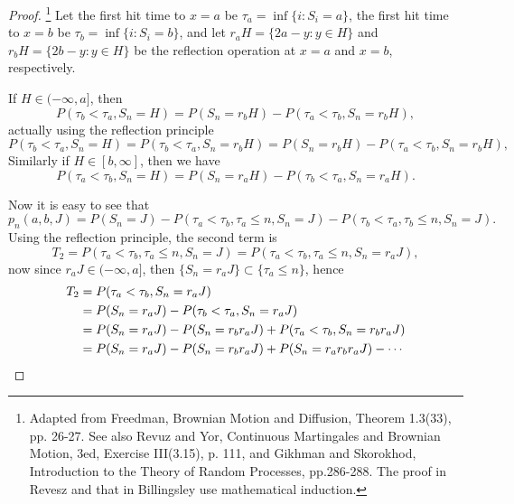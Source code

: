 \begin{proof}
\footnote{Adapted from Freedman, Brownian Motion and Diffusion, 
  Theorem 1.3(33), pp. 26-27.
  See also Revuz and Yor, Continuous Martingales and Brownian Motion, 3ed,
  Exercise III(3.15), p. 111,
  and Gikhman and Skorokhod, Introduction to the Theory of Random Processes,
  pp.286-288. The proof in Revesz and that in Billingsley use mathematical
  induction.} 
Let the first hit time to $x=a$ be $\tau_a=\inf \{i:S_i=a\}$,
the first hit time to $x=b$ be $\tau_b=\inf \{i:S_i=b\}$, 
and let $r_a H=\{2a-y: y\in H\}$ and $r_b H=\{2b-y: y\in H\}$ be the reflection
operation at $x=a$ and $x=b$, respectively.

If $H\in (-\infty,a]$, then
\[
  P(\tau_b <\tau_a, S_n=H) = P(S_n=r_b H) - P(\tau_a<\tau_b, S_n=r_b H),
\]
actually using the reflection principle
\[
  P(\tau_b <\tau_a, S_n=H) 
    = P(\tau_b <\tau_a, S_n=r_b H) 
    = P(S_n=r_b H) - P(\tau_a<\tau_b, S_n=r_b H),
\]
Similarly if $H\in [b,\infty]$, then we have
\[
  P(\tau_a <\tau_b, S_n=H) = P(S_n=r_a H) - P(\tau_b<\tau_a, S_n=r_a H).
\]

Now it is easy to see that
\[
  p_n(a,b,J) = P(S_n=J) - P(\tau_a<\tau_b, \tau_a\le n, S_n=J)
                        - P(\tau_b<\tau_a, \tau_b\le n, S_n=J).
\] 
Using the reflection principle, the second term is
\[
  T_2 = P(\tau_a<\tau_b, \tau_a\le n, S_n=J)
      = P(\tau_a<\tau_b, \tau_a\le n, S_n=r_a J),
\]
now since $r_a J\in (-\infty,a]$, then $\{S_n=r_a J\}\subset \{\tau_a\le n\}$,
hence 
\begin{align*}
  T_2 &= P(\tau_a<\tau_b, S_n=r_a J)  \notag \\
      &= P(S_n=r_a J) - P(\tau_b<\tau_a, S_n=r_a J)  \notag \\
      &= P(S_n=r_a J) - P(S_n=r_b r_a J)+ P(\tau_a<\tau_b, S_n=r_b r_a J) 
         \notag \\
      &= P(S_n=r_a J) - P(S_n=r_b r_a J)+ P(S_n=r_a r_b r_a J) - \cdots  
\end{align*}


\end{proof}
